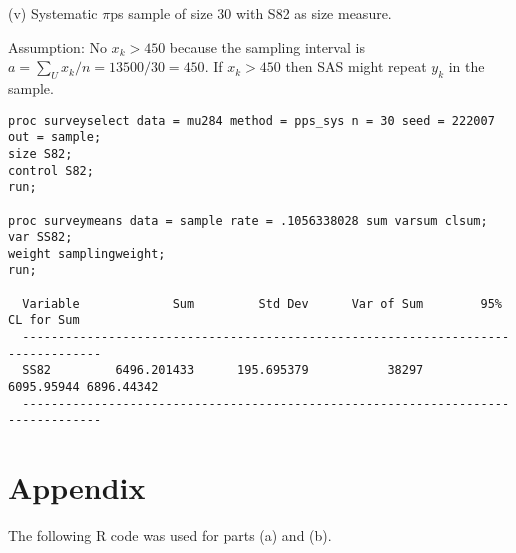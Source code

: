 \documentclass[12pt]{article}
\begin{document}

(v) Systematic $\pi$ps sample of size 30 with S82 as size measure.

Assumption: No $x_k>450$ because the sampling interval is
$a=\sum_Ux_k/n=13500/30=450$.
If $x_k>450$ then SAS might repeat $y_k$ in the sample.

\begin{verbatim}
proc surveyselect data = mu284 method = pps_sys n = 30 seed = 222007 out = sample;
size S82;
control S82;
run;

proc surveymeans data = sample rate = .1056338028 sum varsum clsum;
var SS82;
weight samplingweight;
run;

  Variable             Sum         Std Dev      Var of Sum        95% CL for Sum
  ---------------------------------------------------------------------------------
  SS82         6496.201433      195.695379           38297    6095.95944 6896.44342
  ---------------------------------------------------------------------------------
\end{verbatim}

\section*{Appendix}
The following R code was used for parts (a) and (b).
\end{document}
